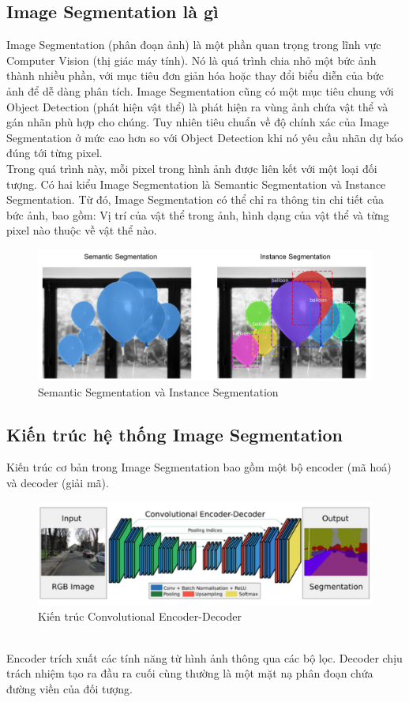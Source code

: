 \subsection{Image Segmentation là gì}
\tab Image Segmentation (phân đoạn ảnh) là một phần quan trọng trong lĩnh vực Computer Vision (thị giác máy tính). Nó là quá trình chia nhỏ một bức ảnh thành nhiều phần, với mục tiêu đơn giản hóa hoặc thay đổi biểu diễn của bức ảnh để dễ dàng phân tích. Image Segmentation cũng có một mục tiêu chung với Object Detection (phát hiện vật thể) là phát hiện ra vùng ảnh chứa vật thể và gán nhãn phù hợp cho chúng. Tuy nhiên tiêu chuẩn về độ chính xác của Image Segmentation ở mức cao hơn so với Object Detection khi nó yêu cầu nhãn dự báo đúng tới từng pixel.\\
\tab Trong quá trình này, mỗi pixel trong hình ảnh được liên kết với một loại đối tượng. Có hai kiểu Image Segmentation là Semantic Segmentation và Instance Segmentation. Từ đó, Image Segmentation có thể chỉ ra thông tin chi tiết của bức ảnh, bao gồm: Vị trí của vật thể trong ảnh, hình dạng của vật thể và từng pixel nào thuộc về vật thể nào.
\begin{figure}[htp]
\begin{center}
    \includegraphics[width=15cm]{img/2_Theory/ss-is.png}
    \caption{Semantic Segmentation và Instance Segmentation}  
\end{center}
\end{figure}
\subsection{Kiến trúc hệ thống Image Segmentation}
\tab Kiến trúc cơ bản trong Image Segmentation bao gồm một bộ encoder (mã hoá) và decoder (giải mã).\\
\begin{figure}[!htb]
\begin{center}
    \includegraphics[width=15cm]{img/2_Theory/conv-encode-decode.png}
    \caption{Kiến trúc Convolutional Encoder-Decoder}  
\end{center}
\end{figure}\\
\tab Encoder trích xuất các tính năng từ hình ảnh thông qua các bộ lọc. Decoder chịu trách nhiệm tạo ra đầu ra cuối cùng thường là một mặt nạ phân đoạn chứa đường viền của đối tượng.
